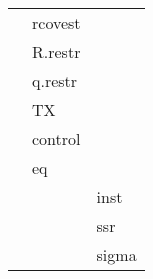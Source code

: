 \begin{table}[htbp]
\begin{tabular}{lll}
                & rcovest        & \\
                & R.restr        & \\
                & q.restr        & \\
                & TX             & \\
                & control        & \\
                & eq             & \\
                &                & inst \\
                &                & ssr \\
                &                & sigma \\
\hline
\end{tabular}
\end{table}
